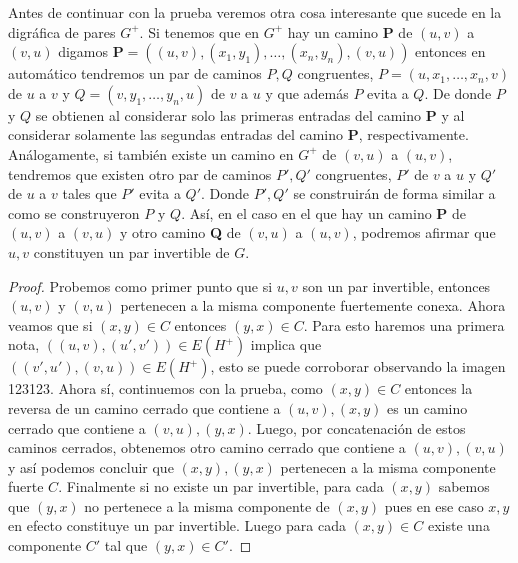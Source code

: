 Antes de continuar con la prueba veremos otra cosa interesante que sucede en la digráfica de pares $G^+$. Si tenemos que en $G^+$ hay un camino \textbf{P} de $(u,v)$ a $(v,u)$ digamos \textbf{P}$=( (u,v), (x_1,y_1), \dots, (x_{n},y_n), (v,u)) $ entonces en automático tendremos un par de caminos $P,Q$ congruentes, $P=(u, x_1, \dots, x_n,v)$ de $u$ a $v$ y $Q=(v,y_1, \dots, y_n, u)$ de $v$ a $u$ y que además $P$ evita a $Q$. De donde $P$ y $Q$ se obtienen al considerar solo las primeras entradas del camino \textbf{P} y al considerar solamente las segundas entradas del camino \textbf{P}, respectivamente.
Análogamente, si también existe un camino en $G^+$ de $(v,u)$ a $(u,v)$, tendremos que existen otro par de caminos $P',Q'$ congruentes, $P'$ de $v$ a $u$ y $Q'$ de $u$ a $v$ tales que $P'$ evita a $Q'$. Donde $P', Q'$ se construirán de forma similar a como se construyeron $P$ y $Q$. Así, en el caso en el que hay un camino \textbf{P} de $(u,v)$ a $(v,u)$ y otro camino \textbf{Q} de $(v,u)$ a $(u,v)$, podremos afirmar que $u,v$ constituyen un par invertible de $G$. 

\begin{proof}
    Probemos como primer punto que si $u,v$ son un par invertible, entonces $(u,v)$ y $(v,u)$ pertenecen a la misma componente fuertemente conexa.
    Ahora veamos que si $(x,y)\in C$ entonces $(y,x)\in C$. Para esto haremos una primera nota, $((u,v),(u',v'))\in E(H^+)$ implica que $((v',u'),(v,u))\in E(H^+)$, esto se puede corroborar observando la imagen 123123. Ahora sí, continuemos con la prueba, como $(x,y) \in C$ entonces la reversa de un camino cerrado que contiene a $(u,v),(x,y)$ es un camino cerrado que contiene a $(v,u),(y,x)$.    Luego, por concatenación de estos caminos cerrados, obtenemos otro camino cerrado que contiene a $(u,v),(v,u)$ y así podemos concluir que $(x,y),(y,x)$ pertenecen a la misma componente fuerte $C$.
    Finalmente si no existe un par invertible, para cada $(x,y)$ sabemos que $(y,x)$ no pertenece a la misma componente de $(x,y)$ pues en ese caso $x,y$ en efecto constituye un par invertible. Luego para cada $(x,y)\in C$ existe una componente $C'$ tal que $(y,x)\in C'$. 
\end{proof}

